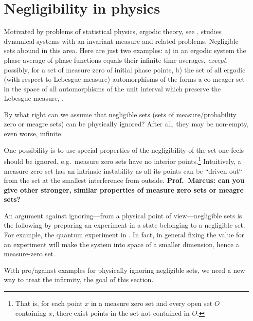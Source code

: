 \documentclass[11pt]{article}
\begin{document}
\section{Negligibility in physics}




Motivated by problems of statistical physics, ergodic theory, see \cite{Walters-1982,Silva-1982},   studies dynamical systems with an invariant measure and related problems.
Negligible sets abound in this area. Here are just two examples: a) in an ergodic system the phase average of phase functions equals their infinite time averages, {\em except}. possibly, for a set of measure zero of initial phase points, b) the set of all ergodic (with respect to Lebesgue measure) automorphisms of the forms a
co-meager set in  the space of all automorphisms of the unit interval which preserve the Lebesgue measure, \cite{OU-1939}.






By what right can we assume that negligible sets (sets of measure/probability zero or meagre sets) can be physically ignored? After all, they may be non-empty, even worse, infinite.

One possibility is to use special properties of the negligibility of the set one feels should be ignored, e.g.\ measure zero sets have no interior points.\footnote{That is, for each point $x$ in a measure zero set and every open set  $O$ containing $x$, there exist points in the set not  contained in $O$. } Intuitively, a measure zero set has an intrinsic instability as all its points can be ``driven out`` from the set at the smallest interference from outside.  {\bf Prof.~Marcus: can you give other stronger, similar  properties of measure zero sets or meagre sets?}

An argument against ignoring---from a physical point of view---negligible sets is the following by preparing
 an experiment in a state belonging to a negligible set. For example, the quantum experiment in \cite{2012-incomput-proofsCJ}. In fact, in general fixing the value for an experiment will make the system into  space of a smaller dimension, hence a measure-zero set.

With pro/against examples  for physically ignoring negligible sets,  we need a new way to treat the infirmity, the goal of this section.
\end{document}
